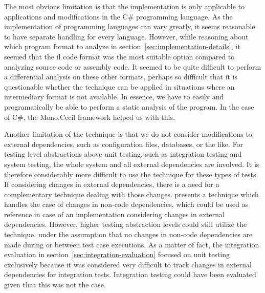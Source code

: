 \documentclass[a4paper,english,12pt]{report}
\begin{document}
The most obvious limitation is that the implementation is only applicable to applications and modifications in the C\# programming language. As the implementation of programming languages can vary greatly, it seems reasonable to have separate handling for every language. However, while reasoning about which program format to analyze in section~\ref{sec:implementation-details}, it seemed that the \gls{il} code format was the most suitable option compared to analyzing source code or assembly code. It seemed to be quite difficult to perform a differential analysis on these other formats, perhaps so difficult that it is questionable whether the technique can be applied in situations where an intermediary format is not available. In essence, we have to easily and programatically be able to perform a static analysis of the program. In the case of C\#, the Mono.Cecil framework helped us with this.

Another limitation of the technique is that we do not consider modifications to external dependencies, such as configuration files, databases, or the like. For testing level abstractions above unit testing, such as integration testing and system testing, the whole system and all external dependencies are involved. It is therefore considerably more difficult to use the technique for these types of tests. If considering changes in external dependencies, there is a need for a complementary technique dealing with those changes. \citet{nanda2011regression} presents a technique which handles the case of changes in non-code dependencies, which could be used as reference in case of an implementation considering changes in external dependencies. However, higher testing abstraction levels could still utilize the technique, under the assumption that no changes in non-code dependencies are made during or between test case executions. As a matter of fact, the integration evaluation in section~\ref{sec:integration-evaluation} focused on unit testing exclusively because it was considered very difficult to track changes in external dependencies for integration tests. Integration testing could have been evaluated given that this was not the case.
\end{document}
